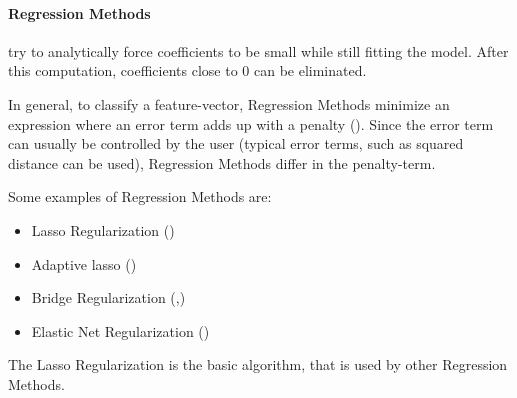 \paragraph{Regression Methods}
\label{par:methods.flat.embedded.regression}


try to analytically force coefficients to be small while
still fitting the model. After this computation, coefficients close to $0$ can
be eliminated.

In general, to classify a feature-vector, Regression Methods minimize an
expression where an error term adds up with a penalty (\cite{Tang:04}). Since
the error term can usually be controlled by the user (typical error terms, such as squared
distance can be used), Regression Methods differ in the penalty-term.

Some examples of Regression Methods are:

\begin{itemize}
  \item Lasso Regularization (\cite{Tibshirani:96})
  \item Adaptive lasso (\cite{Zou:06})
  \item Bridge Regularization (\cite{Knight:00},\cite{Huang:08})
  \item Elastic Net Regularization (\cite{Zou:05})
\end{itemize}

The Lasso Regularization is the basic algorithm, that is used by other
Regression Methods.